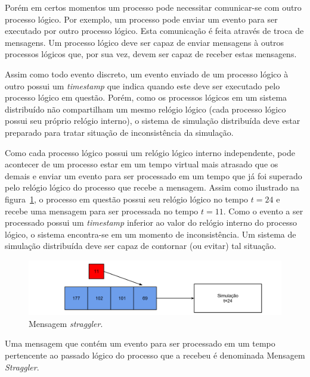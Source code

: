 
Porém em certos momentos um processo pode necessitar comunicar-se com outro processo lógico. Por exemplo, um processo pode enviar um evento para ser executado por outro processo lógico. Esta comunicação é feita através de troca de mensagens. Um processo lógico deve ser capaz de enviar mensagens à outros processos lógicos que, por sua vez, devem ser capaz de receber estas mensagens. 


Assim como todo evento discreto, um evento enviado de um processo lógico à outro possui um \textit{timestamp} que indica quando este deve ser executado pelo processo lógico em questão. Porém, como os processos lógicos em um sistema distribuído não compartilham um mesmo relógio lógico (cada processo lógico possui seu próprio relógio interno), o sistema de simulação distribuída deve estar preparado para tratar situação de inconsistência da simulação.

Como cada processo lógico possui um relógio lógico interno independente, pode acontecer de um processo estar em um tempo virtual mais atrasado que os demais e enviar um evento para ser processado em um tempo que já foi superado pelo relógio lógico do processo que recebe a mensagem. Assim como ilustrado na figura~\ref{fig:strag}, o processo em questão possui seu relógio lógico no tempo $t=24$ e recebe uma mensagem para ser processada no tempo $t=11$. Como o evento a ser processado possui um \textit{timestamp} inferior ao valor do relógio interno do processo lógico, o sistema encontra-se em um momento de inconsistência. Um sistema de simulação distribuída deve ser capaz de contornar (ou evitar) tal situação.

\begin{figure}
  \centerline{\includegraphics[scale=0.4]{straggler.png}}
  \caption{Mensagem \textit{straggler}.}
\label{fig:strag}
\end{figure}

Uma mensagem que contém um evento para ser processado em um tempo pertencente ao passado lógico do processo que a recebeu é denominada Mensagem \textit{Straggler}.

